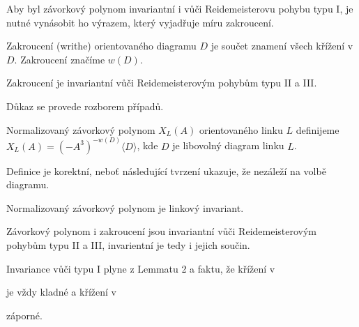 Aby byl závorkový polynom invariantní i vůči Reidemeisterovu pohybu typu I, je nutné vynásobit ho výrazem, který vyjadřuje míru zakroucení.

\begin{definice}
Zakroucení (writhe) orientovaného diagramu $D$ je součet znamení všech křížení v $D$. Zakroucení značíme $w(D)$.
\end{definice}

\begin{lemma}
Zakroucení je invariantní vůči Reidemeisterovým pohybům typu II a III.
\end{lemma}
\begin{dukaz}
Důkaz se provede rozborem případů.
\end{dukaz}

\begin{definice}
Normalizovaný závorkový polynom $X_L(A)$ orientovaného linku $L$ definijeme $X_L(A) = (-A^3)^{-w(D)}\langle D \rangle$, kde $D$ je libovolný diagram linku $L$.
\end{definice}

Definice je korektní, neboť následující tvrzení ukazuje, že nezáleží na volbě diagramu.

\begin{tvrz}
Normalizovaný závorkový polynom je linkový invariant.
\end{tvrz}
\begin{dukaz}
Závorkový polynom i zakroucení jsou invariantní vůči Reidemeisterovým pohybům typu II a III, invarientní je tedy i jejich součin.

Invariance vůči typu I plyne z Lemmatu 2 a faktu, že křížení v  
je vždy kladné a křížení v 
 záporné.
\end{dukaz}

